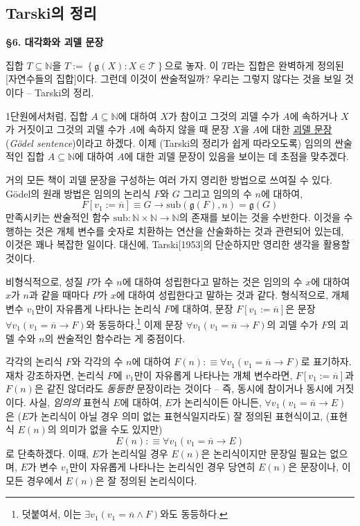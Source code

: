 \documentclass[12pt]{paper}
\newcommand{\gnum}
{ \mathfrak{g}
}
\begin{document}
\subsection{Tarski의 정리}
\hspace{12pt}

\noindent \textbf{\S 6. 대각화와 괴델 문장}

집합 $T \subseteq \mathbb{N}$을 $T := \left\{ \gnum \left( X \right) : X \in \mathcal{T} \right\}$으로 놓자.
이 $T$라는 집합은 완벽하게 정의된 [자연수들의 집합]이다.
그런데 이것이 싼술적일까?
우리는 그렇지 않다는 것을 보일 것이다 -- Tarski의 정리.

1단원에서처럼, 집합 $A \subseteq \mathbb{N}$에 대하여
$X$가 참이고 그것의 괴델 수가 $A$에 속하거나 $X$가 거짓이고 그것의 괴델 수가 $A$에 속하지 않을 때
문장 $X$을 $A$에 대한 \underline{괴델 문장}(\textit{G\"odel sentence})이라고 하겠다.
이제 (Tarski의 정리가 쉽게 따라오도록)
임의의 싼술적인 집합 $A \subseteq \mathbb{N}$에 대하여
$A$에 대한 괴델 문장이 있음을 보이는 데 초점을 맞추겠다.

거의 모든 책이 괴델 문장을 구성하는 여러 가지 영리한 방법으로 쓰여질 수 있다.
G\"odel의 원래 방법은 임의의 논리식 $F$와 $G$ 그리고 임의의 수 $n$에 대하여,
$$F \left[ v_1 := \overline{n} \right] \equiv G \rightarrow \mathrm{sub} \left( \gnum \left( F \right) , n \right) = \gnum \left( G \right)$$
만족시키는 싼술적인 함수 $\mathrm{sub} : \mathbb{N} \times \mathbb{N} \to \mathbb{N}$의 존재를 보이는 것을 수반한다.
이것을 수행하는 것은 개체 변수를 숫자로 치환하는 연산을 산술화하는 것과 관련되어 있는데,
이것은 꽤나 복잡한 일이다.
대신에, Tarski[1953]의 단순하지만 영리한 생각을 활용할 것이다.

비형식적으로, 성질 $P$가 수 $n$에 대하여 성립한다고 말하는 것은
임의의 수 $x$에 대하여 $x$가 $n$과 같을 때마다 $P$가 $x$에 대하여 성립한다고 말하는 것과 같다.
형식적으로, 개체 변수 $v_1$만이 자유롭게 나타나는 논리식 $F$에 대하여,
문장 $F \left[ v_1 := \overline{n} \right]$은 문장 $\forall v_1 \left( v_1 = \overline{n} \rightarrow F \right)$와 동등하다.\footnote
{
덧붙여서, 이는 $\exists v_1 \left( v_1 = \overline{n} \land F \right)$와도 동등하다.
}
이제 문장 $\forall v_1 \left( v_1 = \overline{n} \rightarrow F \right)$의 괴델 수가 $F$의 괴델 수와 $n$의 싼술적인 함수라는 게 중점이다.

각각의 논리식 $F$와 각각의 수 $n$에 대하여 $F \left( n \right) : \equiv \forall v_1 \left( v_1 = \overline{n} \rightarrow F \right)$로 표기하자.
재차 강조하자면, 논리식 $F$에 $v_1$만이 자유롭게 나타나는 개체 변수라면,
$F \left[ v_1 := \overline{n} \right]$과 $F \left( n \right)$은 같진 않더라도 \textit{동등한} 문장이라는 것이다 --
즉, 동시에 참이거나 동시에 거짓이다.
사실, \textit{임의의} 표현식 $E$에 대하여, $E$가 논리식이든 아니든,
$\forall v_1 \left( v_1 = \overline{n} \rightarrow E \right)$은 ($E$가 논리식이 아닐 경우 의미 없는 표현식일지라도) 잘 정의된 표현식이고,
(표현식 $E \left( n \right)$의 의미가 없을 수도 있지만) $$E \left( n \right) : \equiv \forall v_1 \left( v_1 = \overline{n} \rightarrow E \right)$$로 단축하겠다.
이때, $E$가 논리식일 경우 $E \left( n \right)$은 논리식이지만 문장일 필요는 없으며,
$E$가 변수 $v_1$만이 자유롭게 나타나는 논리식인 경우 당연히 $E \left( n \right)$은 문장이나,
이 모든 경우에서 $E \left( n \right)$은 잘 정의된 논리식이다.
\end{document}

